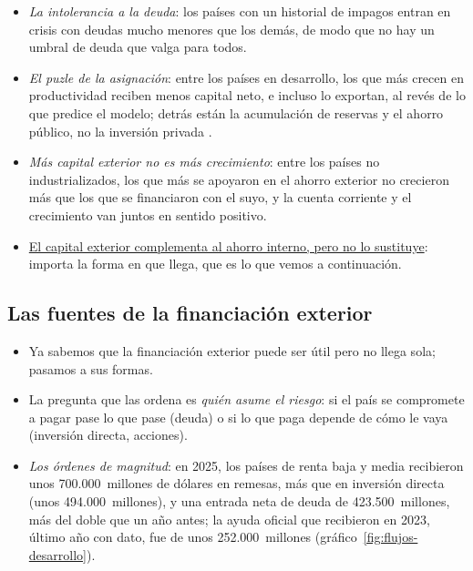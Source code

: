 \documentclass[11pt]{article}
\begin{document}
\begin{itemize}
\begin{enumerate}
\begin{itemize}
    \item la escasez de activos financieros seguros en los países pobres, que concentra el ahorro mundial en los pocos países que los emiten\nocite{CaballeroFarhiGourinchas2017Safe}.
    \end{itemize}
  \end{enumerate}
\item \emph{La intolerancia a la deuda}: los países con un historial de impagos entran en crisis con deudas mucho menores que los demás, de modo que no hay un umbral de deuda que valga para todos\nocite{Reinhart2003Intolerancia}.
\item \emph{El puzle de la asignación}: entre los países en desarrollo, los que más crecen en productividad reciben menos capital neto, e incluso lo exportan, al revés de lo que predice el modelo; detrás están la acumulación de reservas y el ahorro público, no la inversión privada\nocite{GourinchasJeanne2013Capital} .
\item \emph{Más capital exterior no es más crecimiento}: entre los países no industrializados, los que más se apoyaron en el ahorro exterior no crecieron más que los que se financiaron con el suyo, y la cuenta corriente y el crecimiento van juntos en sentido positivo\nocite{PrasadRajanSubramanian2007}.
\item \uline{El capital exterior complementa al ahorro interno, pero no lo sustituye}: importa la forma en que llega, que es lo que vemos a continuación.
\end{itemize}

\subsection{Las fuentes de la financiación exterior}\label{sec:fuentes}

\begin{itemize}
\item Ya sabemos que la financiación exterior puede ser útil pero no llega sola; pasamos a sus formas.
\item La pregunta que las ordena es \emph{quién asume el riesgo}: si el país se compromete a pagar pase lo que pase (deuda) o si lo que paga depende de cómo le vaya (inversión directa, acciones).
\item \emph{Los órdenes de magnitud}: en 2025, los países de renta baja y media recibieron unos 700.000~millones de dólares en remesas, más que en inversión directa (unos 494.000~millones), y una entrada neta de deuda de 423.500~millones, más del doble que un año antes; la ayuda oficial que recibieron en 2023, último año con dato, fue de unos 252.000~millones\nocite{BancoMundial2026WDIFlujos,BancoMundial2026IDR} (gráfico~\ref{fig:flujos-desarrollo}).
\end{itemize}
\end{document}
